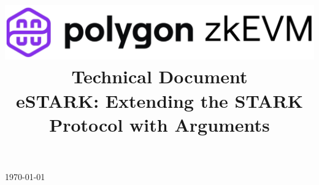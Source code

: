 \documentclass[preprint]{iacrtrans}
\title{
	\includegraphics[width=\columnwidth]{logo_zkEVM.png} 	\\ \vspace{0.3cm}
	Technical Document 										\\ \vspace{0.3cm}	
	eSTARK: Extending the STARK Protocol with Arguments		\\ \vspace{0.3cm}
	\version
}
\institute{}
\theoremstyle{definition}
\begin{document}
\begin{titlepage}
\centering
\maketitle
\today
\vspace{-5mm}
\end{titlepage}


{\hypersetup{linkcolor=.}\tableofcontents}

\newpage




\newpage



\newpage
\appendix



\newpage

\end{document}
